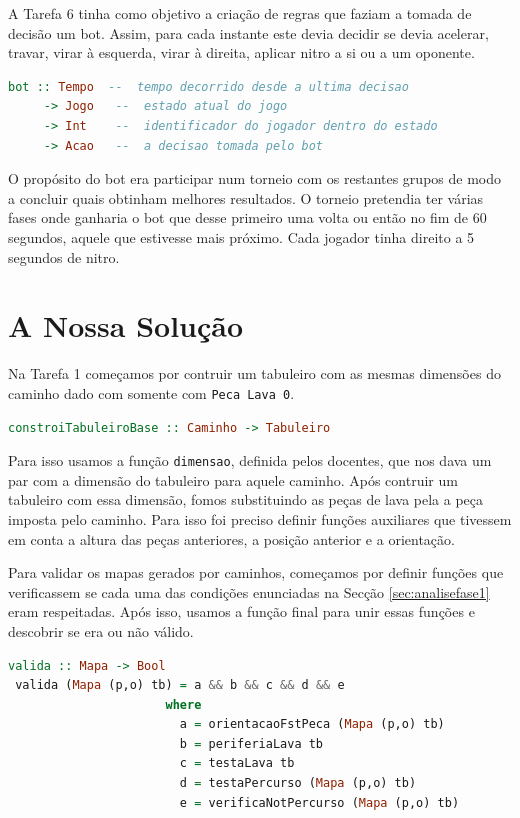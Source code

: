 \documentclass[a4paper]{report}
\begin{document}
A Tarefa 6 tinha como objetivo a criação de regras que faziam a tomada de
decisão um bot. Assim, para cada instante este devia decidir se devia acelerar,
travar, virar à esquerda, virar à direita, aplicar nitro a si ou a um oponente.

\begin{lstlisting}[language=Haskell]
 bot :: Tempo  --  tempo decorrido desde a ultima decisao
     -> Jogo   --  estado atual do jogo
     -> Int    --  identificador do jogador dentro do estado
     -> Acao   --  a decisao tomada pelo bot
\end{lstlisting}

O propósito do bot era participar num torneio com os restantes grupos de modo a
concluir quais obtinham melhores resultados. O torneio pretendia ter várias
fases onde ganharia o bot que desse primeiro uma volta ou então no fim de 60
segundos, aquele que estivesse mais próximo. Cada jogador tinha direito a 5
segundos de nitro.


\chapter{A Nossa Solução}
\label{sec:solucao}

Na Tarefa 1 começamos por contruir um tabuleiro com as mesmas dimensões do
caminho dado com somente com \texttt{Peca Lava 0}.

\begin{lstlisting}[language=Haskell]
 constroiTabuleiroBase :: Caminho -> Tabuleiro
\end{lstlisting}

Para isso usamos a função \texttt{dimensao}, definida pelos docentes, que nos dava
um par com a dimensão do tabuleiro para aquele caminho. Após contruir um
tabuleiro com essa dimensão, fomos substituindo as peças de lava pela a peça
imposta pelo caminho. Para isso foi preciso definir funções auxiliares que
tivessem em conta a altura das peças anteriores, a posição anterior e a
orientação.

Para validar os mapas gerados por caminhos, começamos por definir funções que
verificassem se cada uma das condições enunciadas na Secção
\ref{sec:analisefase1} eram respeitadas. Após isso, usamos a função final para
unir essas funções e descobrir se era ou não válido.

\begin{lstlisting}[language=Haskell]
 valida :: Mapa -> Bool
 valida (Mapa (p,o) tb) = a && b && c && d && e
                      where
                        a = orientacaoFstPeca (Mapa (p,o) tb)
                        b = periferiaLava tb
                        c = testaLava tb
                        d = testaPercurso (Mapa (p,o) tb)
                        e = verificaNotPercurso (Mapa (p,o) tb)
\end{lstlisting}
\end{document}
